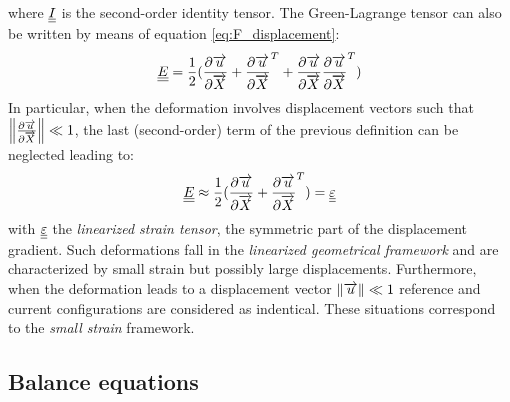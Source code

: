 where ${\underline{\underline{I}}}$ is the second-order identity tensor. The Green-Lagrange tensor can also be written by means of equation \eqref{eq:F_displacement}:
\begin{equation*}
  {\underline{\underline{E}}}=\frac{1}{2}(\frac{\partial {\overrightarrow{u}}}{\partial {\overrightarrow{X}}} + \frac{\partial {\overrightarrow{u}}}{\partial {\overrightarrow{X}}}^T + \frac{\partial {\overrightarrow{u}}}{\partial {\overrightarrow{X}}}\frac{\partial {\overrightarrow{u}}}{\partial {\overrightarrow{X}}}^T)
\end{equation*}
In particular, when the deformation involves displacement vectors such that $\left\Vert\frac{\partial {\overrightarrow{u}}}{\partial {\overrightarrow{X}}}\right\Vert \ll 1$, the last (second-order) term of the previous definition can be neglected leading to:
\begin{equation*}
  {\underline{\underline{E}}} \approx \frac{1}{2}(\frac{\partial {\overrightarrow{u}}}{\partial {\overrightarrow{X}}} + \frac{\partial {\overrightarrow{u}}}{\partial {\overrightarrow{X}}}^T) = {\underline{\underline{\varepsilon}}}
\end{equation*}
with ${\underline{\underline{\varepsilon}}}$ the \textit{linearized strain tensor}, the symmetric part of the displacement gradient. Such deformations fall in the \textit{linearized geometrical framework} and are characterized by small strain but possibly large displacements. Furthermore, when the deformation leads to a displacement vector $\left\Vert{\overrightarrow{u}}\right\Vert \ll 1$ reference and current configurations are considered as indentical. These situations correspond to the \textit{small strain} framework. 

\subsection{Balance equations}

